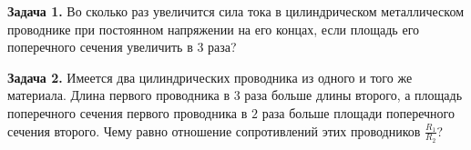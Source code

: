 
\begin{taskbasic}[code={\label{task:elem_ohm_v11_n11}}]
\textbf{Задача 1.} Во сколько раз увеличится сила тока в цилиндрическом металлическом проводнике при постоянном напряжении на его концах, если площадь его поперечного сечения увеличить в $3$ раза?

\end{taskbasic}

\begin{taskbasic}[code={\label{task:elem_ohm_v12_n11}}]
\textbf{Задача 2.} Имеется два цилиндрических проводника из одного и того же материала. Длина первого проводника в $3$ раза больше длины второго, а площадь поперечного сечения первого проводника в $2$ раза больше площади поперечного сечения второго. Чему равно отношение сопротивлений этих проводников $\frac{R_1}{R_2}$?

\end{taskbasic}

